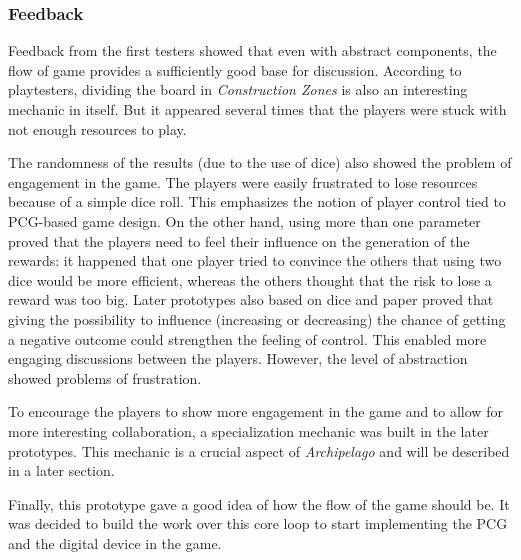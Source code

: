 \subsubsection{Feedback}
Feedback from the first testers showed that even with abstract components, the flow of game provides a sufficiently good base for discussion. According to playtesters, dividing the board in \textit{Construction Zones} is also an interesting mechanic in itself. But it appeared several times that the players were stuck with not enough resources to play.

The randomness of the results (due to the use of dice) also showed the problem of engagement in the game. The players were easily frustrated to lose resources because of a simple dice roll. This emphasizes the notion of player control tied to PCG-based game design. On the other hand, using more than one parameter proved that the players need to feel their influence on the generation of the rewards: it happened that one player tried to convince the others that using two dice would be more efficient, whereas the others thought that the risk to lose a reward was too big. Later prototypes also based on dice and paper proved that giving the possibility to influence (increasing or decreasing) the chance of getting a negative outcome could strengthen the feeling of control. This enabled more engaging discussions between the players. However, the level of abstraction showed problems of frustration.


To encourage the players to show more engagement in the game and to allow for more interesting collaboration, a specialization mechanic was built in the later prototypes. This mechanic is a crucial aspect of \textit{Archipelago} and will be described in a later section. 
 
Finally, this prototype gave a good idea of how the flow of the game should be. It was decided to build the work over this core loop to start implementing the PCG and the digital device in the game.\\\\

